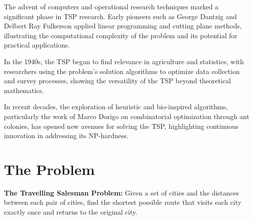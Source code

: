 The advent of computers and operational research techniques marked a significant phase in \Gls{TSP} research. Early pioneers such as George Dantzig and Delbert Ray Fulkerson applied linear programming and cutting plane methods, illustrating the computational complexity of the problem and its potential for practical applications.

In the 1940s, the \Gls{TSP} began to find relevance in agriculture and statistics, with researchers using the problem's solution algorithms to optimize data collection and survey processes, showing the versatility of the \Gls{TSP} beyond theoretical mathematics.

In recent decades, the exploration of heuristic and bio-inspired algorithms, particularly the work of Marco Dorigo on combinatorial optimization through ant colonies, has opened new avenues for solving the \Gls{TSP}, highlighting continuous innovation in addressing its NP-hardness.


\section{The Problem}

\textbf{The Travelling Salesman Problem:} Given a set of cities and the distances between each pair of cities, find the shortest possible route that visits each city exactly once and returns to the original city.



